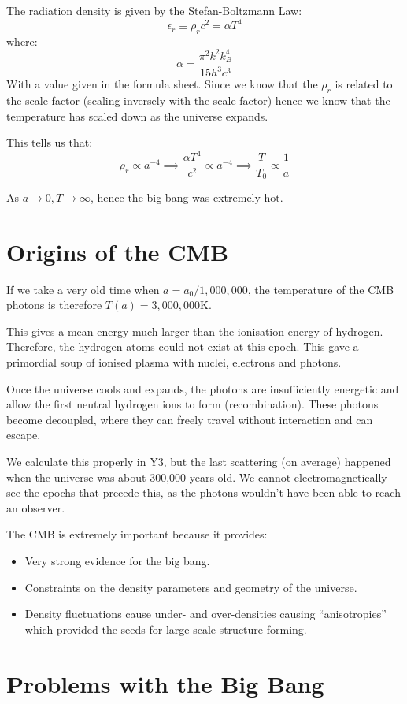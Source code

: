 The radiation density is given by the Stefan-Boltzmann Law:
\[
    \epsilon_r \equiv \rho_r c^2 = \alpha T^4
\]
where:
\[
    \alpha = \frac{\pi^2 k^2 k^4_B}{15 h^3 c^3}
\]
With a value given in the formula sheet. Since we know that the $\rho_r$ is related to the scale factor (scaling inversely with the scale factor) hence we know that the temperature has scaled down as the universe expands.

This tells us that:
\[
    \rho_r \propto a^{-4} \implies \frac{\alpha T^4}{c^2} \propto a^{-4} \implies \frac{T}{T_0} \propto \frac{1}{a}
\]

As $a \to 0, T \to \infty$, hence the big bang was extremely hot.

\section{Origins of the CMB}
If we take a very old time when $a = a_0/1,000,000$, the temperature of the CMB photons is therefore $T(a) = 3,000,000$K.

This gives a mean energy much larger than the ionisation energy of hydrogen. Therefore, the hydrogen atoms could not exist at this epoch. This gave a primordial soup of ionised plasma with nuclei, electrons and photons.

Once the universe cools and expands, the photons are insufficiently energetic and allow the first neutral hydrogen ions to form (recombination). These photons become decoupled, where they can freely travel without interaction and can escape.

We calculate this properly in Y3, but the last scattering (on average) happened when the universe was about 300,000 years old. We cannot electromagnetically see the epochs that precede this, as the photons wouldn't have been able to reach an observer. 

The CMB is extremely important because it provides:
\begin{itemize}
    \item Very strong evidence for the big bang.
    \item Constraints on the density parameters and geometry of the universe.
    \item Density fluctuations cause under- and over-densities causing ``anisotropies'' which provided the seeds for large scale structure forming.
\end{itemize}

\section{Problems with the Big Bang}

